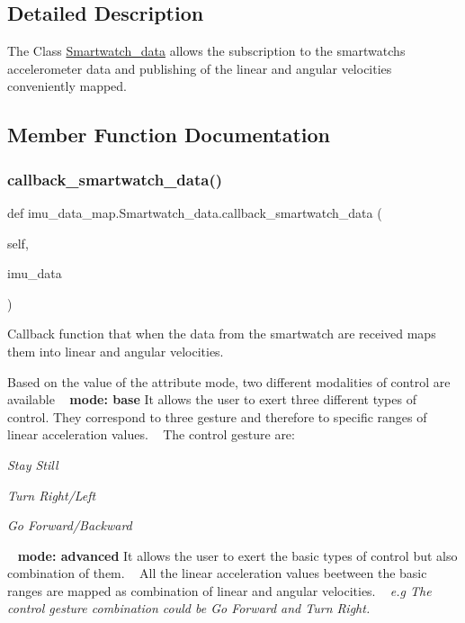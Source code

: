 \subsection{Detailed Description}
The Class \mbox{\hyperlink{classimu__data__map_1_1Smartwatch__data}{Smartwatch\+\_\+data}} allows the subscription to the smartwatch\textquotesingle{}s accelerometer data and publishing of the linear and angular velocities conveniently mapped. 



\subsection{Member Function Documentation}
\mbox{\label{classimu__data__map_1_1Smartwatch__data_ae90cc1ac064c75ea42f00bc34b168708}} 
\subsubsection{\texorpdfstring{callback\+\_\+smartwatch\+\_\+data()}{callback\_smartwatch\_data()}}
{\footnotesize\ttfamily def imu\+\_\+data\+\_\+map.\+Smartwatch\+\_\+data.\+callback\+\_\+smartwatch\+\_\+data (\begin{DoxyParamCaption}\item[{}]{self,  }\item[{}]{imu\+\_\+data }\end{DoxyParamCaption})}



Callback function that when the data from the smartwatch are received maps them into linear and angular velocities. 

Based on the value of the attribute mode, two different modalities of control are available ~\newline
 {\bfseries{mode\+: base}}  It allows the user to exert three different types of control. They correspond to three gesture and therefore to specific ranges of linear acceleration values. ~\newline
 The control gesture are\+: 
\begin{DoxyItemize}
\item {\itshape Stay Still} 
\item {\itshape Turn Right/\+Left} 
\item {\itshape Go Forward/\+Backward}
\end{DoxyItemize} ~\newline
 {\bfseries{mode\+: advanced}}  It allows the user to exert the basic types of control but also combination of them. ~\newline
 All the linear acceleration values beetween the basic ranges are mapped as combination of linear and angular velocities. ~\newline
{\itshape  e.\+g The control gesture combination could be Go Forward and Turn Right.}  

